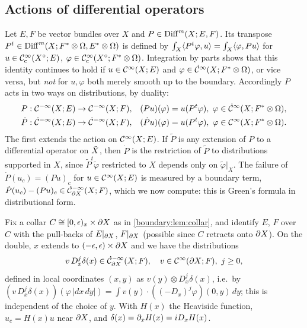 \subsection*{Actions of differential operators}
Let $E,F$ be vector bundles over $X$ and $P\in\operatorname{Diff}^{m}(X;E,F)$. Its transpose
$P^t\in\operatorname{Diff}^{m}(X;F^*\otimes\Omega,E^*\otimes\Omega)$ is defined by $\int_X\langle P^t\varphi, u\rangle=
\int_X\langle \varphi, Pu\rangle$ for $u\in\mathcal{C}^\infty_{\mathrm{c}}(X^\circ;E)$, $\varphi\in\mathcal{C}^\infty_{\mathrm{c}}(X^\circ;F^*\otimes
\Omega)$. Integration by parts shows that this identity continues to hold if
$u\in\mathcal{C}^\infty(X;E)$ and $\varphi\in\dot{\mathcal{C}}^\infty(X;F^*\otimes\Omega)$, or vice versa, but
\emph{not} for $u,\varphi$ both merely smooth up to the boundary. Accordingly $P$ acts
in two ways on distributions, by duality:
\begin{align*}
P&:\CmI(X;E)\to\CmI(X;F), & (Pu)(\varphi)&=u(P^t\varphi),\ \varphi\in\dCI(X;F^*\otimes
\Omega),\\
\dot P&:\dCmI(X;E)\to\dCmI(X;F), & (\dot Pu)(\varphi)&=u(P^t\varphi),\
\varphi\in\CI(X;F^*\otimes\Omega).
\end{align*}
The first extends the action on $\mathcal{C}^\infty(X;E)$. If $\tilde P$ is any extension of $P$ to a
differential operator on $\tilde{X}$, then $\dot P$ is the restriction of $\tilde P$ to
distributions supported in $X$, since $\tilde P^t\tilde\varphi$ restricted to $X$
depends only on $\tilde\varphi|_X$. The failure of $\dot P(u_c)=(Pu)_c$ for $u\in
\mathcal{C}^\infty(X;E)$ is measured by a boundary term, $\dot P(u_c)-(Pu)_c\in\dot{\mathcal{C}}^{-\infty}_{\partial X}(X;F)$,
which we now compute: this is Green's formula in distributional form.

Fix a collar $C\cong[0,\epsilon)_x\times\partial X$ as in \cref{boundary:lem:collar}, and
identify $E$, $F$ over $C$ with the pull-backs of $E|_{\partial X}$, $F|_{\partial X}$ (possible
since $C$ retracts onto $\partial X$). On the double, $x$ extends to
$(-\epsilon,\epsilon)\times\partial X$ and we have the distributions
\begin{equation*}
v\,D_x^j\delta(x)\in\dot{\mathcal{C}}^{-\infty}_{\partial X}(X;F),\quad v\in\mathcal{C}^\infty(\partial X;F),\ j\ge0,
\end{equation*}
defined in local coordinates $(x,y)$ as $v(y)\otimes D_x^j\delta(x)$, i.e.\ by
$(v\,D^j_x\delta(x))(\varphi\,|dx\,dy|)=\int v(y)\cdot((-D_x)^j\varphi)(0,y)\,dy$;
this is independent of the choice of $y$. With $H(x)$ the Heaviside function, $u_c=
H(x)u$ near $\partial X$, and $\delta(x)=\partial_xH(x)=iD_xH(x)$.

